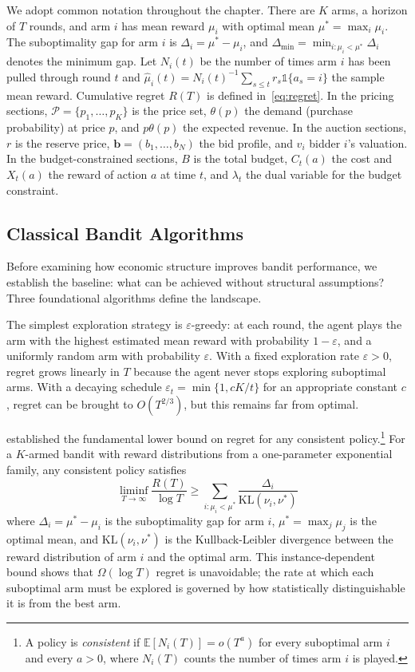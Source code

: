 We adopt common notation throughout the chapter. There are $K$ arms, a horizon of $T$ rounds, and arm $i$ has mean reward $\mu_i$ with optimal mean $\mu^* = \max_i \mu_i$. The suboptimality gap for arm $i$ is $\Delta_i = \mu^* - \mu_i$, and $\Delta_{\min} = \min_{i:\mu_i < \mu^*} \Delta_i$ denotes the minimum gap. Let $N_i(t)$ be the number of times arm $i$ has been pulled through round $t$ and $\hat{\mu}_i(t) = N_i(t)^{-1} \sum_{s \leq t} r_s \mathbb{1}\{a_s = i\}$ the sample mean reward. Cumulative regret $R(T)$ is defined in~\eqref{eq:regret}. In the pricing sections, $\mathcal{P} = \{p_1, \ldots, p_K\}$ is the price set, $\theta(p)$ the demand (purchase probability) at price $p$, and $p\theta(p)$ the expected revenue. In the auction sections, $r$ is the reserve price, $\mathbf{b} = (b_1, \ldots, b_N)$ the bid profile, and $v_i$ bidder $i$'s valuation. In the budget-constrained sections, $B$ is the total budget, $C_t(a)$ the cost and $X_t(a)$ the reward of action $a$ at time $t$, and $\lambda_t$ the dual variable for the budget constraint.

\subsection{Classical Bandit Algorithms}
\label{sec:classical_bandits}

Before examining how economic structure improves bandit performance, we establish the baseline: what can be achieved without structural assumptions? Three foundational algorithms define the landscape.

The simplest exploration strategy is $\varepsilon$-greedy: at each round, the agent plays the arm with the highest estimated mean reward with probability $1 - \varepsilon$, and a uniformly random arm with probability $\varepsilon$. With a fixed exploration rate $\varepsilon > 0$, regret grows linearly in $T$ because the agent never stops exploring suboptimal arms. With a decaying schedule $\varepsilon_t = \min\{1, cK/t\}$ for an appropriate constant $c$, regret can be brought to $O(T^{2/3})$, but this remains far from optimal.

\citet{LaiRobbins1985} established the fundamental lower bound on regret for any consistent policy.\footnote{A policy is \emph{consistent} if $\mathbb{E}[N_i(T)] = o(T^a)$ for every suboptimal arm $i$ and every $a > 0$, where $N_i(T)$ counts the number of times arm $i$ is played.} For a $K$-armed bandit with reward distributions from a one-parameter exponential family, any consistent policy satisfies
\begin{equation}
\liminf_{T \to \infty} \frac{R(T)}{\log T} \geq \sum_{i : \mu_i < \mu^*} \frac{\Delta_i}{\mathrm{KL}(\nu_i, \nu^*)}
\label{eq:lai_robbins}
\end{equation}
where $\Delta_i = \mu^* - \mu_i$ is the suboptimality gap for arm $i$, $\mu^* = \max_j \mu_j$ is the optimal mean, and $\mathrm{KL}(\nu_i, \nu^*)$ is the Kullback-Leibler divergence between the reward distribution of arm $i$ and the optimal arm. This instance-dependent bound shows that $\Omega(\log T)$ regret is unavoidable; the rate at which each suboptimal arm must be explored is governed by how statistically distinguishable it is from the best arm.

